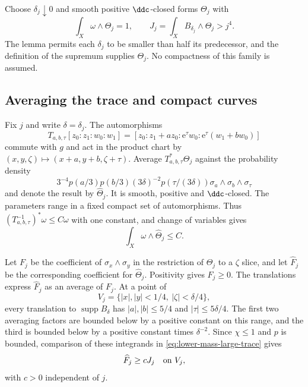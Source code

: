Choose $\delta_j\downarrow0$ and smooth positive $\ddc$-closed forms $\Theta_j$ with
\begin{equation}\label{eq:lower-mass-large-trace}
 \int_X\omega\wedge\Theta_j=1,\qquad
 J_j=\int_XB_{\delta_j}\wedge\Theta_j>j^4.
\end{equation}
The lemma permits each $\delta_j$ to be smaller than half its predecessor, and the definition of the supremum supplies $\Theta_j$. No compactness of this family is assumed.

\subsection{Averaging the trace and compact curves}

Fix $j$ and write $\delta=\delta_j$. The automorphisms
\[
 T_{a,b,\tau}[z_0:z_1:w_0:w_1]
 =[z_0:z_1+az_0:\mathrm{e}^{\tau}w_0:
                  \mathrm{e}^{\tau}(w_1+bw_0)]
\]
commute with $g$ and act in the product chart by
$(x,y,\zeta)\mapsto(x+a,y+b,\zeta+\tau)$.
Average $T_{a,b,\tau}^*\Theta_j$ against the probability density
\[
 3^{-4}p(a/3)p(b/3)(3\delta)^{-2}p(\tau/(3\delta))
       \sigma_a\wedge\sigma_b\wedge\sigma_\tau
\]
and denote the result by $\widehat\Theta_j$. It is smooth, positive and $\ddc$-closed. The parameters range in a fixed compact set of automorphisms. Thus $(T_{a,b,\tau}^{-1})^*\omega\leq C\omega$ with one constant, and change of variables gives
\begin{equation}\label{eq:lower-mass-averaged-degree}
 \int_X\omega\wedge\widehat\Theta_j\leq C.
\end{equation}

Let $F_j$ be the coefficient of $\sigma_x\wedge\sigma_y$ in the restriction of $\Theta_j$ to a $\zeta$ slice, and let $\widehat F_j$ be the corresponding coefficient for $\widehat\Theta_j$. Positivity gives $F_j\geq0$. The translations express $\widehat F_j$ as an average of $F_j$. At a point of
\[
 V_j=\{|x|,|y|<1/4,\ |\zeta|<\delta/4\},
\]
every translation to $\operatorname{supp}B_\delta$ has
$|a|,|b|\leq5/4$ and $|\tau|\leq5\delta/4$. The first two averaging factors are bounded below by a positive constant on this range, and the third is bounded below by a positive constant times $\delta^{-2}$. Since $\chi\leq1$ and $p$ is bounded, comparison of these integrands in \eqref{eq:lower-mass-large-trace} gives
\begin{equation}\label{eq:lower-mass-spread-trace}
 \widehat F_j\geq cJ_j\quad\hbox{on }V_j,
\end{equation}
with $c>0$ independent of $j$.

